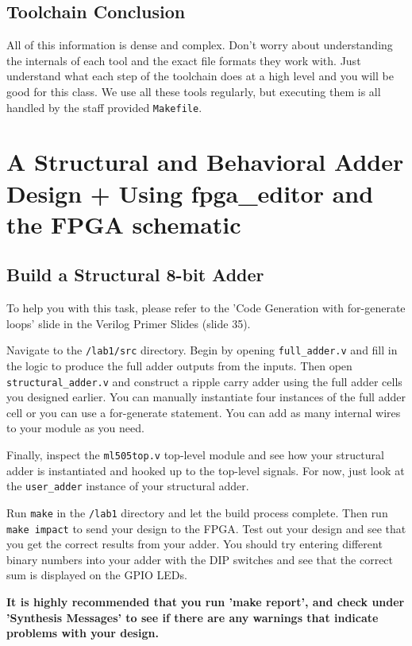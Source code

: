 \documentclass[11pt]{article}
\begin{document}
\subsection{Toolchain Conclusion}
All of this information is dense and complex. Don't worry about understanding the internals of each tool and the exact file formats they work with. Just understand what each step of the toolchain does at a high level and you will be good for this class. We use all these tools regularly, but executing them is all handled by the staff provided \verb|Makefile|.


\section{A Structural and Behavioral Adder Design + Using fpga\_editor and the FPGA schematic}

\subsection{Build a Structural 8-bit Adder}
To help you with this task, please refer to the 'Code Generation with for-generate loops' slide in the Verilog Primer Slides (slide 35).

Navigate to the \verb|/lab1/src| directory. Begin by opening \verb|full_adder.v| and fill in the logic to produce the full adder outputs from the inputs. Then open \verb|structural_adder.v| and construct a ripple carry adder using the full adder cells you designed earlier. You can manually instantiate four instances of the full adder cell or you can use a for-generate statement. You can add as many internal wires to your module as you need.

Finally, inspect the \verb|ml505top.v| top-level module and see how your structural adder is instantiated and hooked up to the top-level signals. For now, just look at the \verb|user_adder| instance of your structural adder.

Run \verb|make| in the \verb|/lab1| directory and let the build process complete. Then run \verb|make impact| to send your design to the FPGA. Test out your design and see that you get the correct results from your adder. You should try entering different binary numbers into your adder with the DIP switches and see that the correct sum is displayed on the GPIO LEDs. 

\textbf{It is highly recommended that you run 'make report', and check under 'Synthesis Messages' to see if there are any warnings that indicate problems with your design.}
\end{document}
